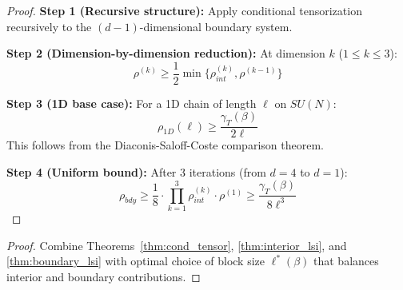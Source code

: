 \begin{proof}
\textbf{Step 1 (Recursive structure):}
Apply conditional tensorization recursively to the $(d-1)$-dimensional boundary system.

\textbf{Step 2 (Dimension-by-dimension reduction):}
At dimension $k$ ($1 \leq k \leq 3$):
\begin{equation}
\rho^{(k)} \geq \frac{1}{2} \min\{\rho_{int}^{(k)}, \rho^{(k-1)}\}
\end{equation}

\textbf{Step 3 (1D base case):}
For a 1D chain of length $\ell$ on $SU(N)$:
\begin{equation}
\rho_{1D}(\ell) \geq \frac{\gamma_T(\beta)}{2\ell}
\end{equation}
This follows from the Diaconis-Saloff-Coste comparison theorem.

\textbf{Step 4 (Uniform bound):}
After 3 iterations (from $d=4$ to $d=1$):
\begin{equation}
\rho_{bdy} \geq \frac{1}{8} \cdot \prod_{k=1}^{3} \rho_{int}^{(k)} \cdot \rho^{(1)} \geq \frac{\gamma_T(\beta)}{8\ell^3}
\end{equation}
\end{proof}


\begin{proof}
Combine Theorems~\ref{thm:cond_tensor}, \ref{thm:interior_lsi}, and \ref{thm:boundary_lsi} with optimal choice of block size $\ell^*(\beta)$ that balances interior and boundary contributions.
\end{proof}


